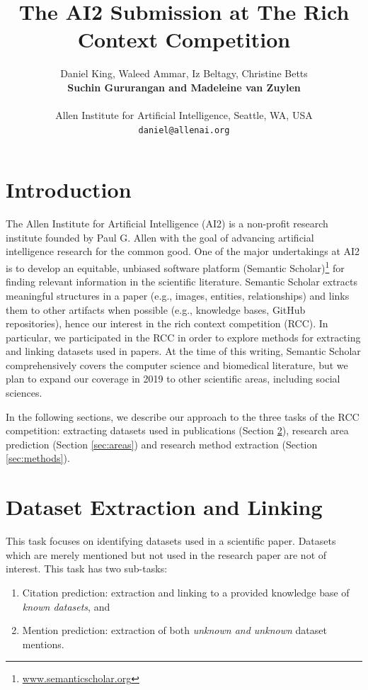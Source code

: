

\title{The AI2 Submission at The Rich Context Competition}

\author{Daniel King, Waleed Ammar, Iz Beltagy, Christine Betts \\ \textbf{Suchin Gururangan and Madeleine van Zuylen} \\
\\
Allen Institute for Artificial Intelligence, Seattle, WA, USA\\
{\tt daniel@allenai.org}\\}


\date{}




\maketitle

\section{Introduction}
The Allen Institute for Artificial Intelligence (AI2) is a non-profit research institute founded by Paul G. Allen with the goal of advancing artificial intelligence research for the common good.
One of the major undertakings at AI2 is to develop an equitable, unbiased software platform (Semantic Scholar)\footnote{\url{www.semanticscholar.org}} for finding relevant information in the scientific literature.
Semantic Scholar extracts meaningful structures in a paper (e.g., images, entities, relationships) and links them to other artifacts when possible (e.g., knowledge bases, GitHub repositories), hence our interest in the rich context competition (RCC).
In particular, we participated in the RCC in order to explore methods for extracting and linking datasets used in papers.
At the time of this writing, Semantic Scholar comprehensively covers the computer science and biomedical literature, but we plan to expand our coverage in 2019 to other scientific areas, including social sciences.

In the following sections, we describe our approach to the three tasks of the RCC competition: extracting datasets used in publications (Section \ref{sec:datasets}), research area prediction (Section \ref{sec:areas}) and research method extraction (Section \ref{sec:methods}).

\section{Dataset Extraction and Linking}\label{sec:datasets}
This task focuses on identifying datasets used in a scientific paper. 
Datasets which are merely mentioned but not used in the research paper are not of interest.
This task has two sub-tasks:
\begin{enumerate}
    \item Citation prediction: extraction and linking to a provided knowledge base of \emph{known datasets}, and 
    \item Mention prediction: extraction of both \emph{unknown and unknown} dataset mentions.
\end{enumerate}

